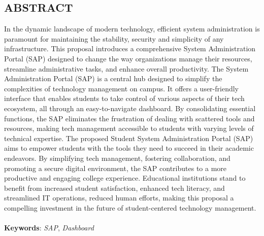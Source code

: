 \begin{center}
\section*{\textbf{ABSTRACT}}
\end{center}
In the dynamic landscape of modern technology, efficient system administration is paramount for maintaining the stability, security and simplicity of any infrastructure. This proposal introduces a comprehensive System Administration Portal (SAP) designed to change the way organizations manage their resources, streamline administrative tasks, and enhance overall productivity. The System Administration Portal (SAP) is a central hub designed to simplify the complexities of technology management on campus. It offers a user-friendly interface that enables students to take control of various aspects of their tech ecosystem, all through an easy-to-navigate dashboard. By consolidating essential functions, the SAP eliminates the frustration of dealing with scattered tools and resources, making tech management accessible to students with varying levels of technical expertise.
The proposed Student System Administration Portal (SAP) aims to empower students with the tools they need to succeed in their academic endeavors. By simplifying tech management, fostering collaboration, and promoting a secure digital environment, the SAP contributes to a more productive and engaging college experience. Educational institutions stand to benefit from increased student satisfaction, enhanced tech literacy, and streamlined IT operations, reduced human efforts, making this proposal a compelling investment in the future of student-centered technology management.\\ \\
\textbf{Keywords}: \textit{SAP}, \textit{Dashboard}
